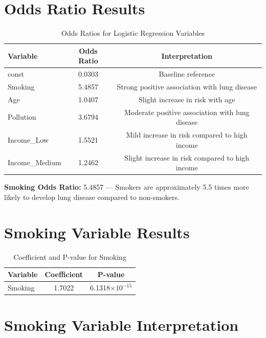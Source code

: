 \documentclass[12pt,a4paper]{report}
\begin{document}
\section*{Odds Ratio Results}

\begin{table}[h!]
\centering
\caption{Odds Ratios for Logistic Regression Variables}
\begin{tabular}{lcc}
\hline
\textbf{Variable} & \textbf{Odds Ratio} & \textbf{Interpretation} \\
\hline
const         & 0.0303 & Baseline reference \\
Smoking       & 5.4857 & Strong positive association with lung disease \\
Age           & 1.0407 & Slight increase in risk with age \\
Pollution     & 3.6794 & Moderate positive association with lung disease \\
Income\_Low   & 1.5521 & Mild increase in risk compared to high income \\
Income\_Medium& 1.2462 & Slight increase in risk compared to high income \\
\hline
\end{tabular}
\end{table}

\vspace{6pt}
\noindent
\textbf{Smoking Odds Ratio:} 5.4857 — Smokers are approximately 5.5 times more likely to develop lung disease compared to non-smokers.
\clearpage
\section*{Smoking Variable Results}

\begin{table}[h!]
\centering
\caption{Coefficient and P-value for Smoking}
\begin{tabular}{lcc}
\hline
\textbf{Variable} & \textbf{Coefficient} & \textbf{P-value} \\
\hline
Smoking & 1.7022 & 6.1318$\times10^{-15}$ \\
\hline
\end{tabular}
\end{table}
\section*{Smoking Variable Interpretation}
\end{document}
